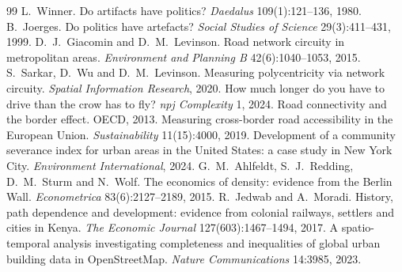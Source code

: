 \documentclass[11pt,a4paper]{article}
\begin{document}
\begin{thebibliography}{99}\small
{} L.~Winner. Do artifacts have politics? \emph{Daedalus}
  109(1):121--136, 1980.
 B.~Joerges. Do politics have artefacts?
  \emph{Social Studies of Science} 29(3):411--431, 1999.
 D.~J.~Giacomin and D.~M.~Levinson. Road network circuity
  in metropolitan areas. \emph{Environment and Planning B} 42(6):1040--1053, 2015.
 S.~Sarkar, D.~Wu and D.~M.~Levinson. Measuring
  polycentricity via network circuity. \emph{Spatial Information Research}, 2020.
 How much longer do you have to drive than the crow has to fly?
  \emph{npj Complexity} 1, 2024.
 Road connectivity and the border effect. OECD, 2013.
 Measuring cross-border road accessibility in the European
  Union. \emph{Sustainability} 11(15):4000, 2019.
 Development of a community severance index for urban
  areas in the United States: a case study in New York City.
  \emph{Environment International}, 2024.
 G.~M.~Ahlfeldt, S.~J.~Redding, D.~M.~Sturm and N.~Wolf.
  The economics of density: evidence from the Berlin Wall.
  \emph{Econometrica} 83(6):2127--2189, 2015.
 R.~Jedwab and A.~Moradi. History, path dependence and
  development: evidence from colonial railways, settlers and cities in Kenya.
  \emph{The Economic Journal} 127(603):1467--1494, 2017.
 A spatio-temporal analysis investigating completeness and
  inequalities of global urban building data in OpenStreetMap.
  \emph{Nature Communications} 14:3985, 2023.
\end{thebibliography}
\end{document}
